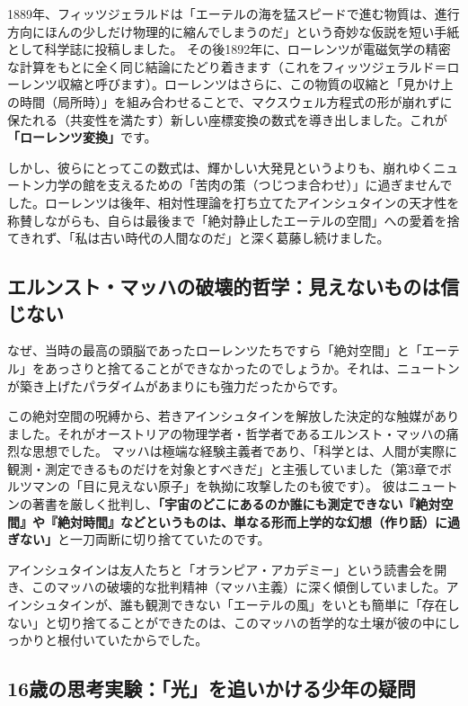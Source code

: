 1889年、フィッツジェラルドは「エーテルの海を猛スピードで進む物質は、進行方向にほんの少しだけ物理的に縮んでしまうのだ」という奇妙な仮説を短い手紙として科学誌に投稿しました。 その後1892年に、ローレンツが電磁気学の精密な計算をもとに全く同じ結論にたどり着きます（これをフィッツジェラルド＝ローレンツ収縮と呼びます）。ローレンツはさらに、この物質の収縮と「見かけ上の時間（局所時）」を組み合わせることで、マクスウェル方程式の形が崩れずに保たれる（共変性を満たす）新しい座標変換の数式を導き出しました。これが\textbf{「ローレンツ変換」}です。

しかし、彼らにとってこの数式は、輝かしい大発見というよりも、崩れゆくニュートン力学の館を支えるための「苦肉の策（つじつま合わせ）」に過ぎませんでした。ローレンツは後年、相対性理論を打ち立てたアインシュタインの天才性を称賛しながらも、自らは最後まで「絶対静止したエーテルの空間」への愛着を捨てきれず、「私は古い時代の人間なのだ」と深く葛藤し続けました。

\subsection{エルンスト・マッハの破壊的哲学：見えないものは信じない}

なぜ、当時の最高の頭脳であったローレンツたちですら「絶対空間」と「エーテル」をあっさりと捨てることができなかったのでしょうか。それは、ニュートンが築き上げたパラダイムがあまりにも強力だったからです。

この絶対空間の呪縛から、若きアインシュタインを解放した決定的な触媒がありました。それがオーストリアの物理学者・哲学者であるエルンスト・マッハの痛烈な思想でした。 マッハは極端な経験主義者であり、「科学とは、人間が実際に観測・測定できるものだけを対象とすべきだ」と主張していました（第3章でボルツマンの「目に見えない原子」を執拗に攻撃したのも彼です）。 彼はニュートンの著書を厳しく批判し、\textbf{「宇宙のどこにあるのか誰にも測定できない『絶対空間』や『絶対時間』などというものは、単なる形而上学的な幻想（作り話）に過ぎない」}と一刀両断に切り捨てていたのです。

アインシュタインは友人たちと「オランピア・アカデミー」という読書会を開き、このマッハの破壊的な批判精神（マッハ主義）に深く傾倒していました。アインシュタインが、誰も観測できない「エーテルの風」をいとも簡単に「存在しない」と切り捨てることができたのは、このマッハの哲学的な土壌が彼の中にしっかりと根付いていたからでした。

\subsection{16歳の思考実験：「光」を追いかける少年の疑問}

